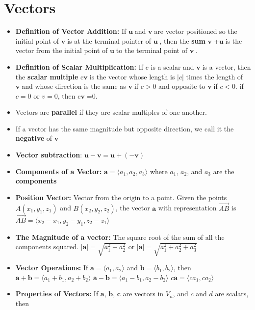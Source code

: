 \documentclass{report}
\newcommand{\vu}{$\mathbf{u}\;$}
\newcommand{\vv}{$\mathbf{v}\;$}
\begin{document}
	\section{Vectors}
		\begin{itemize}\addtolength{\leftskip}{2em}
			\item \textbf{Definition of Vector Addition:} If \vu and \vv are vector positioned so the initial point of \vv is at the terminal pointer of \vu, then the \textbf{sum} \vv+\vu is the vector from the initial point of \vu to the terminal point of \vv.
			\item \textbf{Definition of Scalar Multiplication:} If c is a scalar and \vv is a vector, then the \textbf{scalar multiple} c\vv is the vector whose length is $|c|$ times the length of \vv and whose direction is the same as \vv if $c>0$ and opposite to \vv if $c<0$. if $c=0$ or $v=0$, then c\vv=0.
			\item Vectors are \textbf{parallel} if they are scalar multiples of one another.
			\item If a vector has the same magnitude but opposite direction, we call it the \textbf{negative} of \vv
			\item \textbf{Vector subtraction}: $\mathbf{u}-\mathbf{v}=\mathbf{u}+(-\mathbf{v})$
			\item \textbf{Components of a Vector:} $\mathbf{a}=\langle a_1,a_2,a_3\rangle$ where $a_1$, $a_2$, and $a_3$ are the \textbf{components}
			\item \textbf{Position Vector:} Vector from the origin to a point.
				\subitem Given the points $A(x_1,y_1,z_1)$ and $B(x_2,y_2,z_2)$, the vector $\mathbf{a}$ with representation $\overrightarrow{AB}$ is
					\subsubitem $\overrightarrow{AB}=\langle x_2-x_1,y_2-y_1,z_2-z_1 \rangle$
			\item \textbf{The Magnitude of a vector:} The square root of the sum of all the components squared.
				\subitem $|\mathbf{a}|=\sqrt{a_1^2+a_2^2}$ or $|\mathbf{a}|=\sqrt{a_1^2+a_2^2+a_3^2}$
			\item \textbf{Vector Operations:} If $\mathbf{a}= \langle a_1,a_2 \rangle$ and $\mathbf{b}=\langle b_1,b_2 \rangle$, then
			\subitem \large$\mathbf{a}+\mathbf{b}=\langle a_1+b_1,a_2+b_2 \rangle$
			\subitem \large$\mathbf{a}-\mathbf{b}=\langle a_1-b_1,a_2-b_2 \rangle$
			\subitem \large$c\mathbf{a}=\langle ca_1,ca_2 \rangle$
			\newpage
			\item \textbf{Properties of Vectors:} If $\mathbf{a}$, $\mathbf{b}$, $\mathbf{c}$ are vectors in $V_n$, and $c$ and $d$ are scalars, then

\end{itemize}
\end{document}
